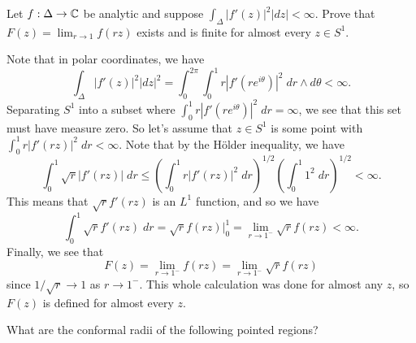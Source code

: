\documentclass{pset}
\begin{document}
\begin{problem}{10}
  Let $f : \Delta \to \mathbb{C}$ be analytic and suppose $\int_\Delta |f'(z)|^2|dz|<\infty$. Prove that $F(z)=\lim_{r\to 1} f(rz)$ exists and is finite for almost every $z\in S^1$.
\end{problem}

\begin{solution}
  Note that in polar coordinates, we have
  \[
    \int_\Delta |f'(z)|^2|dz|^2 = \int_0^{2\pi}\int_0^1 r|f'(re^{i\theta})|^2 \;dr\wedge d\theta <\infty.
  \]
  Separating $S^1$ into a subset where $\int_0^1 r|f'(re^{i\theta})|^2\;dr=\infty$, we see that this set must have measure zero. So let's assume that $z\in S^1$ is some point with $\int_0^1 r|f'(rz)|^2\;dr < \infty$. Note that by the H\"older inequality, we have
  \[
    \int^1_0 \sqrt{r}|f'(rz)|\;dr \leq \left(\int^1_0 r|f'(rz)|^2\;dr\right)^{1/2}\left(\int^1_0 1^2\; dr\right)^{1/2} <\infty.
  \]
  This means that $\sqrt{r} f'(rz)$ is an $L^1$ function, and so we have
  \[
    \int^1_0 \sqrt{r} f'(rz)\;dr = \sqrt{r} f(rz)\big|^1_0 = \lim_{r\to 1^-} \sqrt{r}f(rz) < \infty.
  \]
  Finally, we see that
  \[
    F(z) = \lim_{r\to 1^-} f(rz) = \lim_{r\to 1^-}\sqrt{r} f(rz)
  \]
  since $1/\sqrt{r}\to 1$ as $r\to 1^-$. This whole calculation was done for almost any $z$, so $F(z)$ is defined for almost every $z$.
\end{solution}

\begin{problem}{12}
  What are the conformal radii of the following pointed regions?
\end{problem}
\end{document}

